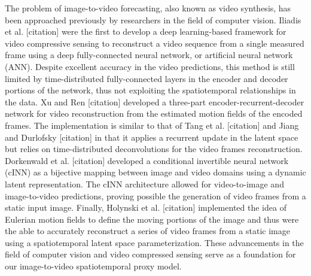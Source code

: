 \documentclass[10pt, twoside]{article}
\begin{document}
The problem of image-to-video forecasting, also known as video synthesis, has been approached previously by researchers in the field of computer vision. Iliadis et al. [citation] were the first to develop a deep learning-based framework for video compressive sensing to reconstruct a video sequence from a single measured frame using a deep fully-connected neural network, or artificial neural network (ANN). Despite excellent accuracy in the video predictions, this method is still limited by time-distributed fully-connected layers in the encoder and decoder portions of the network, thus not exploiting the spatiotemporal relationships in the data. Xu and Ren [citation] developed a three-part encoder-recurrent-decoder network for video reconstruction from the estimated motion fields of the encoded frames. The implementation is similar to that of Tang et al. [citation] and Jiang and Durlofsky [citation] in that it applies a recurrent update in the latent space but relies on time-distributed deconvolutions for the video frames reconstruction. Dorkenwald et al. [citation] developed a conditional invertible neural network (cINN) as a bijective mapping between image and video domains using a dynamic latent representation. The cINN architecture allowed for video-to-image and image-to-video predictions, proving possible the generation of video frames from a static input image. Finally, Holynski et al. [citation] implemented the idea of Eulerian motion fields to define the moving portions of the image and thus were the able to accurately reconstruct a series of video frames from a static image using a spatiotemporal latent space parameterization. These advancements in the field of computer vision and video compressed sensing serve as a foundation for our image-to-video spatiotemporal proxy model.
\end{document}
